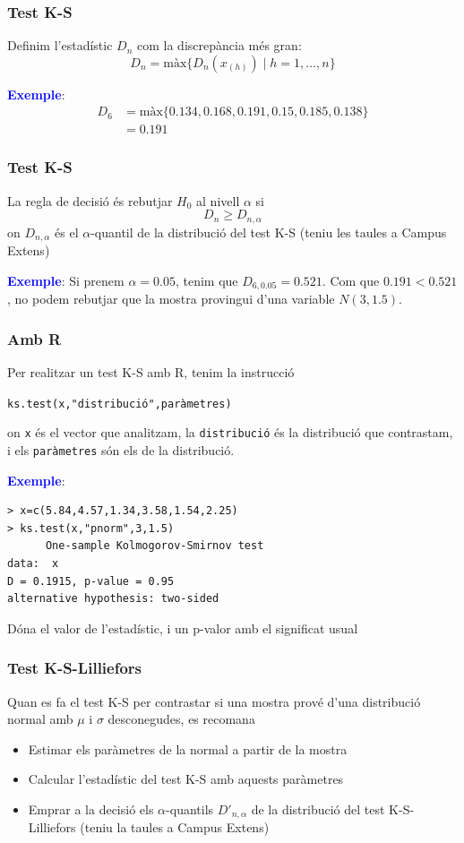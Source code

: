 \documentclass[12pt,t]{beamer}
\newcommand{\blue}[1]{\textcolor{blue}{#1}}
\renewcommand{\emph}[1]{{\color{red}#1}}
\renewcommand{\geq}{\geqslant}
\theoremstyle{plain}
\theoremstyle{definition}
\begin{document}
\begin{frame}
\frametitle{Test K-S}
Definim l'estadístic \emph{$D_n$} com la discrepància més gran:
$$
D_n=\mbox{màx}\big\{D_n(x_{(h)})\mid h=1,\ldots, n\big\}
$$

\blue{\bf Exemple}: 
$$
\begin{array}{rl}
D_6& =\mbox{màx}\{0.134,0.168,0.191,0.15,0.185,0.138\}\\ &=0.191
\end{array}
$$

\end{frame}

\begin{frame}
\frametitle{Test K-S}

La \emph{regla de decisió} és rebutjar $H_0$ al nivell $\alpha$ si
$$
D_n\geq D_{n,\alpha}
$$
on $D_{n,\alpha}$ és el $\alpha$-quantil de la distribució del test K-S (teniu les taules a Campus Extens)
\medskip


\blue{\bf Exemple}: Si prenem $\alpha=0.05$, tenim que $D_{6,0.05}=0.521$.
Com que $0.191<0.521$, no podem rebutjar que la mostra provingui d'una variable $N(3,1.5)$.

\end{frame}

\begin{frame}[fragile]
\frametitle{Amb R}
\vspace*{-1ex}

Per realitzar un test K-S amb R, tenim la instrucció
\begin{center}
\texttt{ks.test(x,"distribució",paràmetres)}
\end{center} 
on \texttt{x} és el vector que analitzam, la \texttt{distribució} és la distribució que contrastam, i els \texttt{paràmetres} són els de la distribució.
\medskip


\blue{\bf Exemple}: 
\begin{verbatim}
> x=c(5.84,4.57,1.34,3.58,1.54,2.25)
> ks.test(x,"pnorm",3,1.5)
      One-sample Kolmogorov-Smirnov test
data:  x 
D = 0.1915, p-value = 0.95
alternative hypothesis: two-sided
\end{verbatim}
Dóna el valor de l'estadístic, i un p-valor amb el significat usual


\end{frame}

\begin{frame}
\frametitle{Test K-S-Lilliefors}

Quan es fa el test K-S per contrastar si una mostra prové d'una distribució \emph{normal amb $\mu$ i $\sigma$ desconegudes}, es recomana
\begin{itemize}
\item Estimar els paràmetres de la normal a partir de la mostra
\medskip

\item Calcular l'estadístic del test K-S amb aquests paràmetres
\medskip

\item Emprar  a la decisió els $\alpha$-quantils $D'_{n,\alpha}$ de la distribució del \emph{test K-S-Lilliefors} (teniu la taules a Campus Extens)
\end{itemize}

\end{frame}
\end{document}
